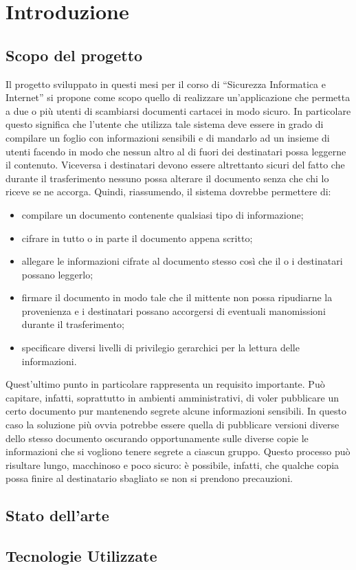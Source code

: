 \def \ti{\textit}
\def \bf{\textbf}

\chapter{Introduzione}
	\label{cap:intro}
	
\section{Scopo del progetto}
	\label{sec:scopo}

Il progetto sviluppato in questi mesi per il corso di ``Sicurezza Informatica e Internet'' si propone come scopo quello di realizzare un'applicazione che permetta a due o più utenti di scambiarsi documenti cartacei in modo sicuro. In particolare questo significa che l'utente che utilizza tale sistema deve essere in grado di compilare un foglio con informazioni sensibili e di mandarlo ad un insieme di utenti facendo in modo che nessun altro al di fuori dei destinatari possa leggerne il contenuto. Viceversa i destinatari devono essere altrettanto sicuri del fatto che durante il trasferimento nessuno possa alterare il documento senza che chi lo riceve se ne accorga.
Quindi, riassumendo, il sistema dovrebbe permettere di:
\begin{itemize}
	\item compilare un documento contenente qualsiasi tipo di informazione;
	\item cifrare in tutto o in parte il documento appena scritto;
	\item allegare le informazioni cifrate al documento stesso così che il o i destinatari possano leggerlo;
	\item firmare il documento in modo tale che il mittente non possa ripudiarne la provenienza e i destinatari possano accorgersi di eventuali manomissioni durante il trasferimento;
	\item specificare diversi livelli di privilegio gerarchici per la lettura delle informazioni.
\end{itemize}
Quest'ultimo punto in particolare rappresenta un requisito importante. Può capitare, infatti, soprattutto in ambienti amministrativi, di voler pubblicare un certo documento pur mantenendo segrete alcune informazioni sensibili. In questo caso la soluzione più ovvia potrebbe essere quella di pubblicare versioni diverse dello stesso documento oscurando opportunamente sulle diverse copie le informazioni che si vogliono tenere segrete a ciascun gruppo. Questo processo può risultare lungo, macchinoso e poco sicuro: è possibile, infatti, che qualche copia possa finire al destinatario sbagliato se non si prendono precauzioni.

\section{Stato dell'arte}
	\label{sec:statoarte}

\section{Tecnologie Utilizzate}
	\label{sec:tecnologie}
